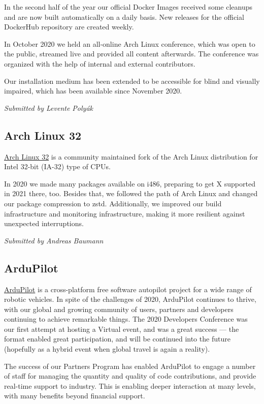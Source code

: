 \documentclass[a4paper]{report}
\begin{document}
In the second half of the year our official Docker Images received some cleanups and are now built automatically on a daily basis. New releases for the official DockerHub repository are created weekly.

In October 2020 we held an all-online Arch Linux conference, which was open to the public, streamed live and provided all content afterwards. The conference was organized with the help of internal and external contributors.

Our installation medium has been extended to be accessible for blind and visually impaired, which has been available since November 2020.

{\em Submitted by Levente Polyák}

\subsection{Arch Linux 32}

\href{https://archlinux32.org/}{Arch Linux 32} is a community maintained fork of the Arch Linux distribution for Intel 32-bit (IA-32) type of CPUs.

In 2020 we made many packages available on i486, preparing to get X supported in 2021 there, too.  Besides that, we followed the path of Arch Linux and changed our package compression to zstd.  Additionally, we improved our build infrastructure and monitoring infrastructure, making it more resilient against unexpected interruptions.

{\em Submitted by Andreas Baumann}

\subsection{ArduPilot}

\href{https://ardupilot.org/}{ArduPilot} is a cross-platform free software autopilot project for a wide range of robotic vehicles. In spite of the challenges of 2020, ArduPilot continues to thrive, with our global and growing community of users, partners and developers continuing to achieve remarkable things. The 2020 Developers Conference was our first attempt at hosting a Virtual event, and was a great success --- the format enabled great participation, and will be continued into the future (hopefully as a hybrid event when global travel is again a reality).

The success of our Partners Program has enabled ArduPilot to engage a number of staff for managing the quantity and quality of code contributions, and provide real-time support to industry. This is enabling deeper interaction at many levels, with many benefits beyond financial support.
\end{document}
